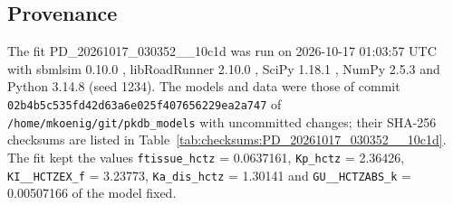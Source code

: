 \subsection{Provenance}

The fit PD\_20261017\_030352\_\_10c1d was run on 2026-10-17 01:03:57 UTC with sbmlsim 0.10.0 \cite{Koenig2026_sbmlsim}, libRoadRunner 2.10.0 \cite{Welsh2023}, SciPy 1.18.1 \cite{Virtanen2020}, NumPy 2.5.3 \cite{Harris2020} and Python 3.14.8 (seed 1234). The models and data were those of commit \texttt{02b4b5c535fd42d63a6e025f407656229ea2a747} of \texttt{/home/mkoenig/git/pkdb\_models} with uncommitted changes; their SHA-256 checksums are listed in Table~\ref{tab:checksums:PD_20261017_030352__10c1d}. The fit kept the values \texttt{ftissue\_hctz} = 0.0637161, \texttt{Kp\_hctz} = 2.36426, \texttt{KI\_\_HCTZEX\_f} = 3.23773, \texttt{Ka\_dis\_hctz} = 1.30141 and \texttt{GU\_\_HCTZABS\_k} = 0.00507166 of the model fixed.

